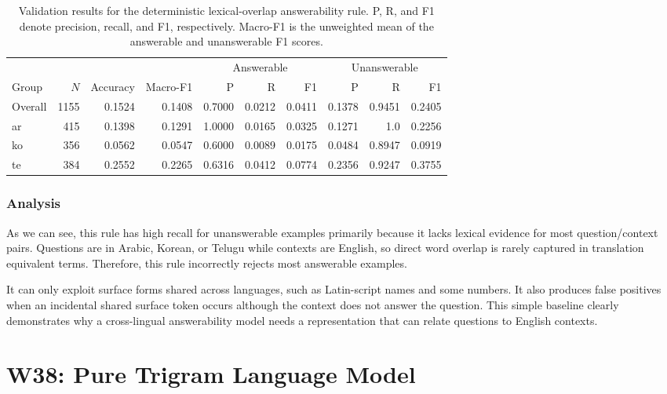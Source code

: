 \documentclass[11pt]{article}
\begin{document}
\begin{table}[!h]
    \centering
    \small
    \begin{tabular}{lrrrrrrrrr}
        \toprule
        & & & &
        \multicolumn{3}{c}{Answerable}
        & \multicolumn{3}{c}{Unanswerable} \\
        \cmidrule(lr){5-7}\cmidrule(lr){8-10}
        Group & $N$ & Accuracy & Macro-F1
        & P & R & F1
        & P & R & F1 \\
        \midrule
            Overall & 1155 & 0.1524 & 0.1408 & 0.7000 & 0.0212 & 0.0411 & 0.1378 & 0.9451 & 0.2405 \\
            ar & 415 & 0.1398 & 0.1291 & 1.0000 & 0.0165 & 0.0325 & 0.1271 & 1.0 & 0.2256 \\
            ko & 356 & 0.0562 & 0.0547 & 0.6000 & 0.0089 & 0.0175 & 0.0484 & 0.8947 & 0.0919 \\
            te & 384 & 0.2552 & 0.2265 & 0.6316 & 0.0412 & 0.0774 & 0.2356 & 0.9247 & 0.3755 \\
        \bottomrule
    \end{tabular}
    \caption{Validation results for the deterministic lexical-overlap answerability rule. P, R, and F1 denote precision, recall, and F1, respectively. Macro-F1 is the unweighted mean of the answerable and unanswerable F1 scores.}
    \label{table:week_36_baseline_results}
\end{table}

\subsubsection*{Analysis}

\noindent
As we can see, this rule has high recall for unanswerable examples primarily because it lacks lexical evidence for most question/context pairs. Questions are in Arabic, Korean, or Telugu while contexts are English, so direct word overlap is rarely captured in translation equivalent terms. Therefore, this rule incorrectly rejects most answerable examples. 

\noindent
It can only exploit surface forms shared across languages, such as Latin-script names and some numbers. It also produces false positives when an incidental shared surface token occurs although the context does not answer the question. This simple baseline clearly demonstrates why a cross-lingual answerability model needs a representation that can relate questions to English contexts.


\section{W38: Pure Trigram Language Model}
\end{document}
